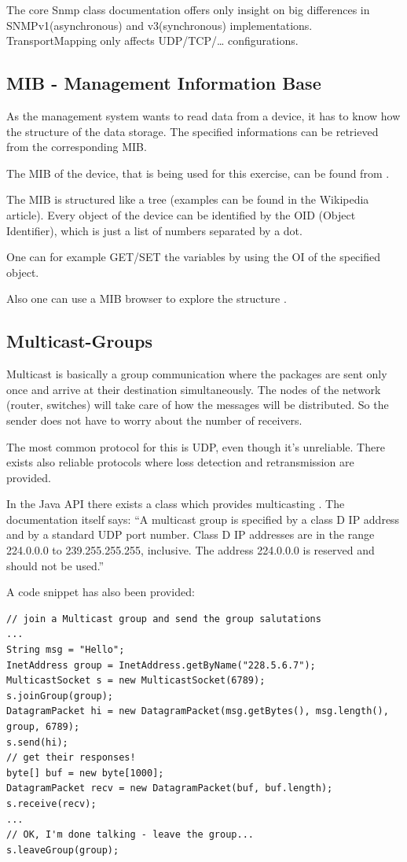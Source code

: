 \documentclass[11pt, a4paper]{article}
\begin{document}
The core Snmp class documentation \cite{SNMP4JDoc} offers only insight on big differences in SNMPv1(asynchronous) and v3(synchronous) implementations. TransportMapping only affects UDP/TCP/… configurations.

\subsection{MIB - Management Information Base}
As the management system wants to read data from a device, it has to know how the structure of the data storage. The specified informations can be retrieved from the corresponding MIB. 

The MIB of the device, that is being used for this exercise, can be found from \cite{MIBDownload}.

The MIB is structured like a tree (examples can be found in the Wikipedia article). Every object of the device can be identified by the OID (Object Identifier), which is just a list of numbers separated by a dot.

One can for example GET/SET the variables by using the OI of the specified object.

Also one can use a MIB browser to explore the structure \cite{MIBBrowser}.
\subsection{Multicast-Groups}

Multicast is basically a group communication where the packages are sent only once and arrive at their destination simultaneously. The nodes of the network (router, switches) will take care of how the messages will be distributed. So the sender does not have to worry about the number of receivers.

The most common protocol for this is UDP, even though it’s unreliable. There exists also reliable protocols where loss detection and retransmission are provided.

In the Java API there exists a class which provides multicasting \cite{javamulticast}. The documentation itself says:
“A multicast group is specified by a class D IP address and by a standard UDP port number. Class D IP addresses are in the range 224.0.0.0 to 239.255.255.255, inclusive. The address 224.0.0.0 is reserved and should not be used.”

A code snippet has also been provided:

\begin{lstlisting}
// join a Multicast group and send the group salutations
...
String msg = "Hello";
InetAddress group = InetAddress.getByName("228.5.6.7");
MulticastSocket s = new MulticastSocket(6789);
s.joinGroup(group);
DatagramPacket hi = new DatagramPacket(msg.getBytes(), msg.length(),
group, 6789);
s.send(hi);
// get their responses!
byte[] buf = new byte[1000];
DatagramPacket recv = new DatagramPacket(buf, buf.length);
s.receive(recv);
...
// OK, I'm done talking - leave the group...
s.leaveGroup(group);
\end{lstlisting}
\end{document}
